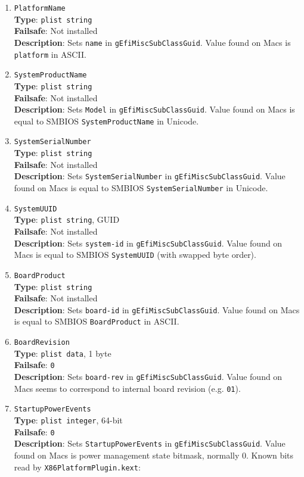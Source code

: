 \documentclass[]{article}
\begin{document}
\begin{enumerate}
\item
  \texttt{PlatformName}\\
  \textbf{Type}: \texttt{plist\ string}\\
  \textbf{Failsafe}: Not installed\\
  \textbf{Description}: Sets \texttt{name} in
  \texttt{gEfiMiscSubClassGuid}. Value found on Macs is
  \texttt{platform} in ASCII.
\item
  \texttt{SystemProductName}\\
  \textbf{Type}: \texttt{plist\ string}\\
  \textbf{Failsafe}: Not installed\\
  \textbf{Description}: Sets \texttt{Model} in
  \texttt{gEfiMiscSubClassGuid}. Value found on Macs is equal to SMBIOS
  \texttt{SystemProductName} in Unicode.
\item
  \texttt{SystemSerialNumber}\\
  \textbf{Type}: \texttt{plist\ string}\\
  \textbf{Failsafe}: Not installed\\
  \textbf{Description}: Sets \texttt{SystemSerialNumber} in
  \texttt{gEfiMiscSubClassGuid}. Value found on Macs is equal to SMBIOS
  \texttt{SystemSerialNumber} in Unicode.
\item
  \texttt{SystemUUID}\\
  \textbf{Type}: \texttt{plist\ string}, GUID\\
  \textbf{Failsafe}: Not installed\\
  \textbf{Description}: Sets \texttt{system-id} in
  \texttt{gEfiMiscSubClassGuid}. Value found on Macs is equal to SMBIOS
  \texttt{SystemUUID} (with swapped byte order).
\item
  \texttt{BoardProduct}\\
  \textbf{Type}: \texttt{plist\ string}\\
  \textbf{Failsafe}: Not installed\\
  \textbf{Description}: Sets \texttt{board-id} in
  \texttt{gEfiMiscSubClassGuid}. Value found on Macs is equal to SMBIOS
  \texttt{BoardProduct} in ASCII.
\item
  \texttt{BoardRevision}\\
  \textbf{Type}: \texttt{plist\ data}, 1 byte\\
  \textbf{Failsafe}: \texttt{0}\\
  \textbf{Description}: Sets \texttt{board-rev} in
  \texttt{gEfiMiscSubClassGuid}. Value found on Macs seems to correspond
  to internal board revision (e.g. \texttt{01}).
\item
  \texttt{StartupPowerEvents}\\
  \textbf{Type}: \texttt{plist\ integer}, 64-bit\\
  \textbf{Failsafe}: \texttt{0}\\
  \textbf{Description}: Sets \texttt{StartupPowerEvents} in
  \texttt{gEfiMiscSubClassGuid}. Value found on Macs is power management
  state bitmask, normally 0. Known bits read by
  \texttt{X86PlatformPlugin.kext}:


\end{enumerate}
\end{document}
